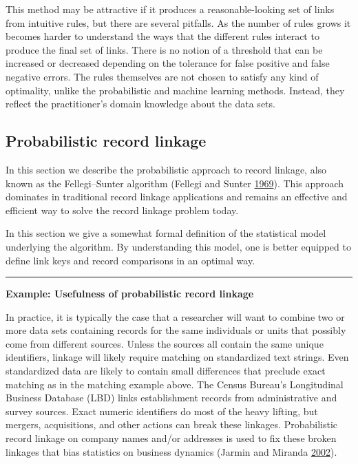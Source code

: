 \documentclass[]{krantz}
\begin{document}
This method may be attractive if it produces a reasonable-looking set of
links from intuitive rules, but there are several pitfalls. As the
number of rules grows it becomes harder to understand the ways that the
different rules interact to produce the final set of links. There is no
notion of a threshold that can be increased or decreased depending on
the tolerance for false positive and false negative errors. The rules
themselves are not chosen to satisfy any kind of optimality, unlike the
probabilistic and machine learning methods. Instead, they reflect the
practitioner's domain knowledge about the data sets.

\subsection{Probabilistic record
linkage}\label{probabilistic-record-linkage}

In this section we describe the probabilistic approach to record
linkage, also known as the Fellegi--Sunter algorithm (Fellegi and Sunter
\protect\hyperlink{ref-FS69}{1969}). This approach dominates in
traditional record linkage applications and remains an effective and
efficient way to solve the record linkage problem today.

In this section we give a somewhat formal definition of the statistical
model underlying the algorithm. By understanding this model, one is
better equipped to define link keys and record comparisons in an optimal
way.

\begin{center}\rule{0.5\linewidth}{\linethickness}\end{center}

\textbf{Example: Usefulness of probabilistic record linkage}

In practice, it is typically the case that a researcher will want to
combine two or more data sets containing records for the same
individuals or units that possibly come from different sources. Unless
the sources all contain the same unique identifiers, linkage will likely
require matching on standardized text strings. Even standardized data
are likely to contain small differences that preclude exact matching as
in the matching example above. The Census Bureau's Longitudinal Business
Database (LBD) links establishment records from administrative and
survey sources. Exact numeric identifiers do most of the heavy lifting,
but mergers, acquisitions, and other actions can break these linkages.
Probabilistic record linkage on company names and/or addresses is used
to fix these broken linkages that bias statistics on business dynamics
(Jarmin and Miranda
\protect\hyperlink{ref-jarmin2002longitudinal}{2002}).
\end{document}
